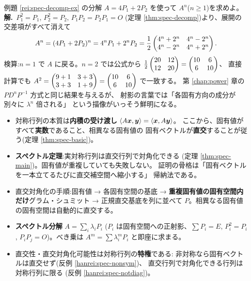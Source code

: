 \begin{rei}[例題・標準(スペクトル分解でべき乗)]\label{rei:spec-power}
例題 \ref{rei:spec-decomp-ex} の分解 $A = 4P_1 + 2P_2$ を使って
$A^n$($n \ge 1$)を求めよ。\\
\textbf{解.}\ $P_1^2 = P_1$, $P_2^2 = P_2$, $P_1P_2 = P_2P_1 = O$
(定理 \ref{thm:spec-decomp})より、展開の交差項がすべて消えて
\[
A^n = (4P_1 + 2P_2)^n = 4^nP_1 + 2^nP_2
= \frac{1}{2}\begin{pmatrix}4^n + 2^n & 4^n - 2^n \\ 4^n - 2^n & 4^n + 2^n\end{pmatrix}.
\]
検算:$n = 1$ で $A$ に戻る。$n = 2$ では公式から
$\frac{1}{2}\begin{pmatrix}20 & 12 \\ 12 & 20\end{pmatrix} = \begin{pmatrix}10 & 6 \\ 6 & 10\end{pmatrix}$、
直接計算でも $A^2 = \begin{pmatrix}9 + 1 & 3 + 3 \\ 3 + 3 & 1 + 9\end{pmatrix}
= \begin{pmatrix}10 & 6 \\ 6 & 10\end{pmatrix}$ で一致する。
第 \ref{chap:power} 章の $P D^n P^{-1}$ 方式と同じ結果を与えるが、
射影の言葉では「各固有方向の成分が別々に $\lambda^n$ 倍される」
という描像がいっそう鮮明になる。
\end{rei}

\begin{matome}
\begin{itemize}
\item 対称行列の本質は\textbf{内積の受け渡し}
$\langle A\bm{x}, \bm{y} \rangle = \langle \bm{x}, A\bm{y} \rangle$。
ここから、固有値がすべて\textbf{実数}であること、相異なる固有値の
固有ベクトルが\textbf{直交}することが従う(定理 \ref{thm:spec-basic})。
\item \textbf{スペクトル定理}:実対称行列は直交行列で対角化できる
(定理 \ref{thm:spec-main})。固有値が重複していても失敗しない。
証明の骨格は「固有ベクトルを一本立てるたびに直交補空間へ縮小する」
帰納法である。
\item 直交対角化の手順:固有値 → 各固有空間の基底 →
\textbf{重複固有値の固有空間内だけ}グラム・シュミット →
正規直交基底を列に並べて $P$。相異なる固有値の固有空間は自動的に直交する。
\item \textbf{スペクトル分解} $A = \sum_i \lambda_iP_i$
($P_i$ は固有空間への正射影、$\sum P_i = E$, $P_i^2 = P_i$,
$P_iP_j = O$)。べき乗は $A^m = \sum \lambda_i^mP_i$ と即座に求まる。
\item 直交性・直交対角化可能性は対称行列の\textbf{特権}である:
非対称なら固有ベクトルは直交せず(反例 \ref{hanrei:spec-nonsym})、
直交行列で対角化できる行列は対称行列に限る
(反例 \ref{hanrei:spec-notdiag})。
\end{itemize}
\end{matome}

